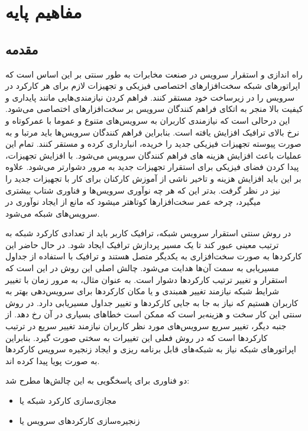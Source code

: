 \chapter{مفاهیم پایه}

\section{مقدمه}

راه اندازی و استقرار سرویس در صنعت مخابرات به طور سنتی بر این اساس است که اپراتورهای شبکه سخت‌افزارهای اختصاصی فیزیکی و تجهیزات لازم برای هر کارکرد در سرویس را در زیرساخت خود مستقر کنند.
فراهم کردن نیازمندی‌هایی مانند پایداری و کیفیت بالا منجر به اتکای فراهم کنندگان سرویس بر سخت‌افزارهای اختصاصی می‌شود. 
این درحالی است که نیازمندی کاربران به سرویس‌های متنوع و عموما با عمرکوتاه و نرخ بالای ترافیک افزایش یافته است.
بنابراین فراهم کنندگان سرویس‌ها باید مرتبا و به صورت پیوسته تجهیزات فیزیکی جدید را خریده، انبارداری کرده و مستقر کنند.
تمام این عملیات باعث افزایش هزینه های فراهم کنندگان سرویس می‌شود.
با افزایش تجهیزات، پیدا کردن فضای فیزیکی برای استقرار تجهیزات جدید به مرور دشوارتر می‌شود.
علاوه بر این باید افزایش هزینه و تاخیر ناشی از آموزش کارکنان برای کار با تجهیزات جدید را نیز در نظر گرفت.
بدتر این که هر چه نوآوری سرویس‌ها و فناوری شتاب بیشتری می‍گیرد، چرخه عمر سخت‌افزارها کوتاه‍تر می‍شود که مانع از ایجاد نوآوری در سرویس‌های شبکه می‌شود.

در روش سنتی استقرار سرویس شبکه، ترافیک کاربر باید از تعدادی کارکرد شبکه به ترتیب معینی عبور کند تا یک مسیر پردازش ترافیک ایجاد شود.
در حال حاضر این کارکردها به صورت سخت‌افزاری به یکدیگر متصل هستند و ترافیک با استفاده از جداول مسیریابی به سمت آن‌ها هدایت می‌شود.
چالش اصلی این روش در این است که استقرار و تغییر ترتیب کارکردها دشوار است.
به عنوان مثال، به مرور زمان با تغییر شرایط شبکه نیازمند تغییر همبندی و یا مکان کارکردها برای سرویس‌دهی بهتر به کاربران هستیم که نیاز به جا به جایی کارکردها و تغییر جداول مسیریابی دارد.
در روش سنتی این کار سخت و هزینه‌بر است که ممکن است خطاهای بسیاری در آن رخ دهد.
از جنبه دیگر، تغییر سریع سرویس‌های مورد نظر کاربران نیازمند تغییر سریع در ترتیب کارکردها است که در روش فعلی این تغییرات به سختی صورت گیرد.
بنابراین اپراتورهای شبکه نیاز به شبکه‌های قابل برنامه ریزی و ایجاد زنجیره سرویس کارکردها به صورت پویا پیدا کرده اند.

دو فناوری برای پاسخگویی به این چالش‌ها مطرح شد:

\begin{itemize}
    \item مجازی‌سازی کارکرد شبکه یا 
    \item زنجیره‌سازی کارکردهای سرویس یا 
\end{itemize}

